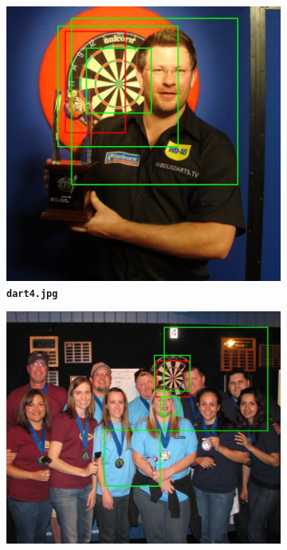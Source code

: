 \documentclass[12pt]{article}
\begin{document}
\begin{figure}[htb]
	\centering
	\begin{subfigure}[b]{.48\linewidth}
		\centering
		\includegraphics[width=\linewidth]{task2/result/dart4_detected.jpg}
		\caption{\textbf{\texttt{dart4.jpg}}}
	\end{subfigure}
	\begin{subfigure}[b]{.48\linewidth}
		\centering
		\includegraphics[width=\linewidth]{task2/result/dart5_detected.jpg}

\end{subfigure}
\end{figure}
\end{document}
